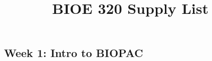 \documentclass{article}
\title{BIOE 320 Supply List}
\author{ }
\date{}
\begin{document}
\maketitle
\subsection*{Week 1: Intro to BIOPAC}
\end{document}
